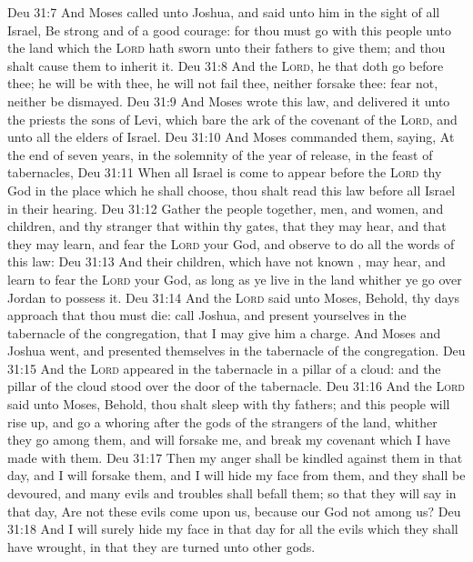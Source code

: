 \vs Deu 31:7 And Moses called unto Joshua, and said unto him in the sight of all Israel, Be strong and of a good courage: for thou must go with this people unto the land which the \textsc{Lord} hath sworn unto their fathers to give them; and thou shalt cause them to inherit it.
\vs Deu 31:8 And the \textsc{Lord}, he  that doth go before thee; he will be with thee, he will not fail thee, neither forsake thee: fear not, neither be dismayed.
\vs Deu 31:9 And Moses wrote this law, and delivered it unto the priests the sons of Levi, which bare the ark of the covenant of the \textsc{Lord}, and unto all the elders of Israel.
\vs Deu 31:10 And Moses commanded them, saying, At the end of  seven years, in the solemnity of the year of release, in the feast of tabernacles,
\vs Deu 31:11 When all Israel is come to appear before the \textsc{Lord} thy God in the place which he shall choose, thou shalt read this law before all Israel in their hearing.
\vs Deu 31:12 Gather the people together, men, and women, and children, and thy stranger that  within thy gates, that they may hear, and that they may learn, and fear the \textsc{Lord} your God, and observe to do all the words of this law:
\vs Deu 31:13 And  their children, which have not known , may hear, and learn to fear the \textsc{Lord} your God, as long as ye live in the land whither ye go over Jordan to possess it.
\vs Deu 31:14 And the \textsc{Lord} said unto Moses, Behold, thy days approach that thou must die: call Joshua, and present yourselves in the tabernacle of the congregation, that I may give him a charge. And Moses and Joshua went, and presented themselves in the tabernacle of the congregation.
\vs Deu 31:15 And the \textsc{Lord} appeared in the tabernacle in a pillar of a cloud: and the pillar of the cloud stood over the door of the tabernacle.
\vs Deu 31:16 And the \textsc{Lord} said unto Moses, Behold, thou shalt sleep with thy fathers; and this people will rise up, and go a whoring after the gods of the strangers of the land, whither they go  among them, and will forsake me, and break my covenant which I have made with them.
\vs Deu 31:17 Then my anger shall be kindled against them in that day, and I will forsake them, and I will hide my face from them, and they shall be devoured, and many evils and troubles shall befall them; so that they will say in that day, Are not these evils come upon us, because our God  not among us?
\vs Deu 31:18 And I will surely hide my face in that day for all the evils which they shall have wrought, in that they are turned unto other gods.
